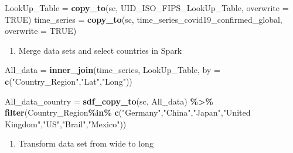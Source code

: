 \documentclass[
]{article}
\newenvironment{Shaded}{\begin{snugshade}}{\end{snugshade}}
\newcommand{\AttributeTok}[1]{\textcolor[rgb]{0.13,0.29,0.53}{#1}}
\newcommand{\ConstantTok}[1]{\textcolor[rgb]{0.56,0.35,0.01}{#1}}
\newcommand{\FunctionTok}[1]{\textcolor[rgb]{0.13,0.29,0.53}{\textbf{#1}}}
\newcommand{\NormalTok}[1]{#1}
\newcommand{\OtherTok}[1]{\textcolor[rgb]{0.56,0.35,0.01}{#1}}
\newcommand{\SpecialCharTok}[1]{\textcolor[rgb]{0.81,0.36,0.00}{\textbf{#1}}}
\newcommand{\StringTok}[1]{\textcolor[rgb]{0.31,0.60,0.02}{#1}}
\providecommand{\tightlist}{%
  \setlength{\itemsep}{0pt}\setlength{\parskip}{0pt}}
\begin{document}
\begin{Shaded}
\begin{Highlighting}[]
\NormalTok{LookUp\_Table }\OtherTok{=} \FunctionTok{copy\_to}\NormalTok{(sc, UID\_ISO\_FIPS\_LookUp\_Table, }\AttributeTok{overwrite =} \ConstantTok{TRUE}\NormalTok{)}
\NormalTok{time\_series }\OtherTok{=} \FunctionTok{copy\_to}\NormalTok{(sc, time\_series\_covid19\_confirmed\_global, }\AttributeTok{overwrite =} \ConstantTok{TRUE}\NormalTok{)}
\end{Highlighting}
\end{Shaded}

\begin{enumerate}
\def\labelenumi{\arabic{enumi}.}
\setcounter{enumi}{2}
\tightlist
\item
  Merge data sets and select countries in Spark
\end{enumerate}

\begin{Shaded}
\begin{Highlighting}[]
\NormalTok{All\_data }\OtherTok{=} \FunctionTok{inner\_join}\NormalTok{(time\_series, LookUp\_Table, }\AttributeTok{by =} \FunctionTok{c}\NormalTok{(}\StringTok{"Country\_Region"}\NormalTok{,}\StringTok{"Lat"}\NormalTok{,}\StringTok{"Long"}\NormalTok{))}

\NormalTok{All\_data\_country }\OtherTok{=} \FunctionTok{sdf\_copy\_to}\NormalTok{(sc, All\_data) }\SpecialCharTok{\%\textgreater{}\%} \FunctionTok{filter}\NormalTok{(Country\_Region}\SpecialCharTok{\%in\%}
                  \FunctionTok{c}\NormalTok{(}\StringTok{"Germany"}\NormalTok{,}\StringTok{"China"}\NormalTok{,}\StringTok{"Japan"}\NormalTok{,}\StringTok{"United Kingdom"}\NormalTok{,}\StringTok{"US"}\NormalTok{,}\StringTok{"Brail"}\NormalTok{,}\StringTok{"Mexico"}\NormalTok{))}
\end{Highlighting}
\end{Shaded}

\begin{enumerate}
\def\labelenumi{\arabic{enumi}.}
\setcounter{enumi}{3}
\tightlist
\item
  Transform data set from wide to long
\end{enumerate}
\end{document}
